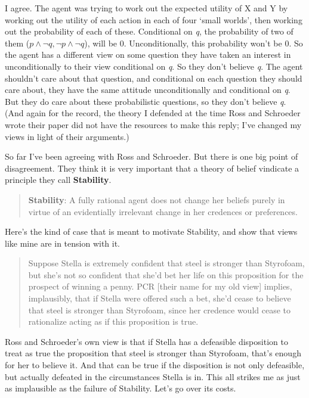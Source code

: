 \documentclass[11pt,]{book}
\begin{document}
I agree. The agent was trying to work out the expected utility of X and Y by working out the utility of each action in each of four `small worlds', then working out the probability of each of these. Conditional on \emph{q}, the probability of two of them (\(p \wedge \neg q, \neg p \wedge \neg q\)), will be 0. Unconditionally, this probability won't be 0. So the agent has a different view on some question they have taken an interest in unconditionally to their view conditional on \emph{q}. So they don't believe \emph{q}. The agent shouldn't care about that question, and conditional on each question they should care about, they have the same attitude unconditionally and conditional on \emph{q}. But they do care about these probabilistic questions, so they don't believe \emph{q}. (And again for the record, the theory I defended at the time Ross and Schroeder wrote their paper did not have the resources to make this reply; I've changed my views in light of their arguments.)

So far I've been agreeing with Ross and Schroeder. But there is one big point of disagreement. They think it is very important that a theory of belief vindicate a principle they call \textbf{Stability}.

\begin{quote}
\textbf{Stability}: A fully rational agent does not change her beliefs purely in virtue of an evidentially irrelevant change in her credences or preferences. \citeyearpar[20]{RossSchroeder2014}
\end{quote}

Here's the kind of case that is meant to motivate Stability, and show that views like mine are in tension with it.

\begin{quote}
Suppose Stella is extremely confident that steel is stronger than Styrofoam, but she's not so confident that she'd bet her life on this proposition for the prospect of winning a penny. PCR {[}their name for my old view{]} implies, implausibly, that if Stella were offered such a bet, she'd cease to believe that steel is stronger than Styrofoam, since her credence would cease to rationalize acting as if this proposition is true. \citeyearpar[20]{RossSchroeder2014}
\end{quote}

Ross and Schroeder's own view is that if Stella has a defeasible disposition to treat as true the proposition that steel is stronger than Styrofoam, that's enough for her to believe it. And that can be true if the disposition is not only defeasible, but actually defeated in the circumstances Stella is in. This all strikes me as just as implausible as the failure of Stability. Let's go over its costs.
\end{document}
